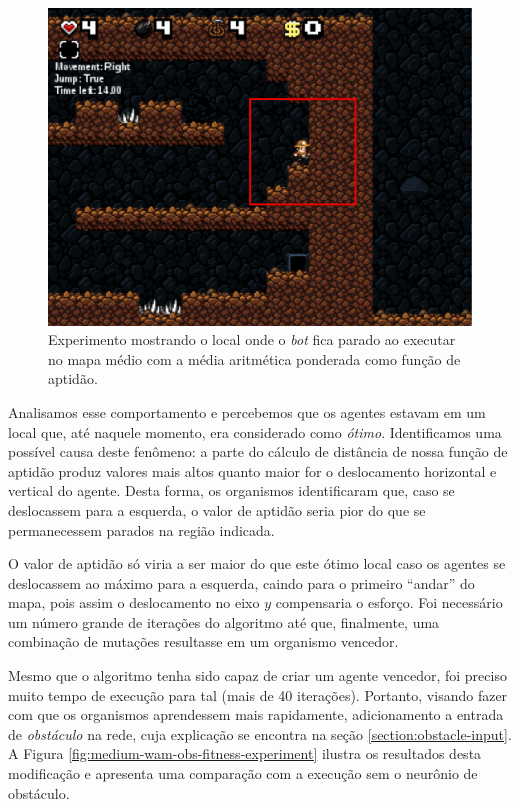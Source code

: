 \begin{figure}[htb!]
\centering
\includegraphics[width=.5\textwidth]{fig/experiment-medium-stuck.pdf}
\caption{Experimento mostrando o local onde o \textit{bot} fica parado ao
    executar no mapa médio com a média aritmética ponderada como função de
    aptidão.}
\label{fig:experiment-medium-stuck}
\end{figure}

Analisamos esse comportamento e percebemos que os agentes estavam em um local
que, até naquele momento, era considerado como \textit{ótimo}.  Identificamos
uma possível causa deste fenômeno: a parte do cálculo de distância de nossa
função de aptidão produz valores mais altos quanto maior for o deslocamento
horizontal e vertical do agente. Desta forma, os organismos identificaram que,
caso se deslocassem para a esquerda, o valor de aptidão seria pior do que se
permanecessem parados na região indicada.

O valor de aptidão só viria a ser maior do que este ótimo local caso os agentes
se deslocassem ao máximo para a esquerda, caindo para o primeiro ``andar'' do
mapa, pois assim o deslocamento no eixo $y$ compensaria o esforço. Foi
necessário um número grande de iterações do algoritmo até que, finalmente, uma
combinação de mutações resultasse em um organismo vencedor.

Mesmo que o algoritmo tenha sido capaz de criar um agente vencedor, foi preciso
muito tempo de execução para tal (mais de 40 iterações). Portanto, visando fazer
com que os organismos aprendessem mais rapidamente, adicionamento a entrada de
\textit{obstáculo} na rede, cuja explicação se encontra na seção
\ref{section:obstacle-input}. A Figura
\ref{fig:medium-wam-obs-fitness-experiment} ilustra os resultados desta
modificação e apresenta uma comparação com a execução sem o neurônio de
obstáculo.

